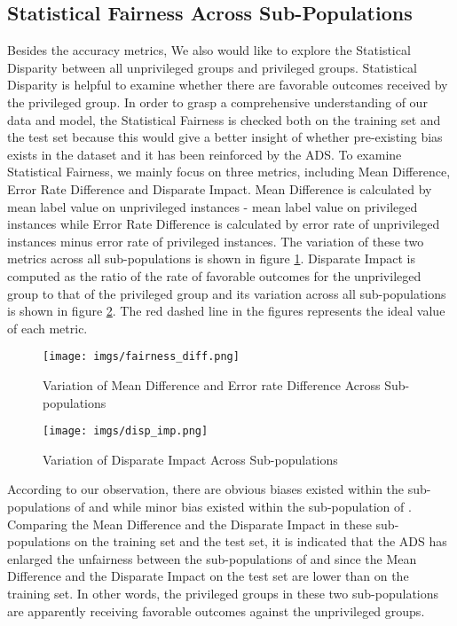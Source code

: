 \documentclass[10pt]{article}
\newcommand{\code}[1]{{\color{black}{\texttt{#1}}}} %
\begin{document}
\FloatBarrier
\subsection{Statistical Fairness Across Sub-Populations}
Besides the accuracy metrics, We also would like to explore the Statistical Disparity between all unprivileged groups and privileged groups. Statistical Disparity is helpful to examine whether there are favorable outcomes received by the privileged group. In order to grasp a comprehensive understanding of our data and model, the Statistical Fairness is checked both on the training set and the test set because this would give a better insight of whether pre-existing bias exists in the dataset and it has been reinforced by the ADS. To examine Statistical Fairness, we mainly focus on three metrics, including Mean Difference, Error Rate Difference and Disparate Impact. Mean Difference is calculated by mean label value on unprivileged instances - mean label value on privileged instances while Error Rate Difference is calculated by error rate of unprivileged instances minus error rate of privileged instances. The variation of these two metrics across all sub-populations is shown in figure \ref{fig:fair_diff}. Disparate Impact is computed as the ratio of the rate of favorable outcomes for the unprivileged group to that of the privileged group and its variation across all sub-populations is shown in figure \ref{fig:disp}. The red dashed line in the figures represents the ideal value of each metric.


\begin{figure}[h!]
    \centering
    \texttt{[image: imgs/fairness\_diff.png]}
    \caption{Variation of Mean Difference and Error rate Difference Across Sub-populations}
    \label{fig:fair_diff}
\end{figure}

\begin{figure}[h!]
    \centering
    \texttt{[image: imgs/disp\_imp.png]}
    \caption{Variation of Disparate Impact Across Sub-populations }
    \label{fig:disp}
\end{figure}

According to our observation, there are obvious biases existed within the sub-populations of \code{age} and \code{smoker} while minor bias existed within the sub-population of \code{bmi}. Comparing the Mean Difference and the Disparate Impact in these sub-populations on the training set and the test set, it is indicated that the ADS has enlarged the unfairness between the sub-populations of \code{age} and \code{smoker} since the Mean Difference and the Disparate Impact on the test set are lower than on the training set. In other words, the privileged groups in these two sub-populations are apparently receiving favorable outcomes against the unprivileged groups.
\end{document}
